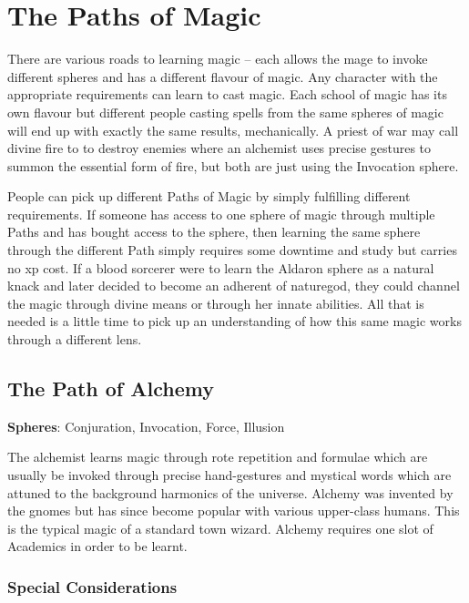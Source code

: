 \section{The Paths of Magic}

\begin{multicols}{2}

\noindent
There are various roads to learning magic -- each allows the mage to invoke different spheres and has a different flavour of magic.
Any character with the appropriate requirements can learn to cast magic.
Each school of magic has its own flavour but different people casting spells from the same spheres of magic will end up with exactly the same results, mechanically.
A priest of war may call divine fire to to destroy enemies where an alchemist uses precise gestures to summon the essential form of fire, but both are just using the Invocation sphere.

People can pick up different Paths of Magic by simply fulfilling different requirements.
If someone has access to one sphere of magic through multiple Paths and has bought access to the sphere, then learning the same sphere through the different Path simply requires some \gls{downtime} and study but carries no \gls{xp} cost.
If a blood sorcerer were to learn the Aldaron sphere as a natural knack and later decided to become an adherent of \gls{naturegod}, they could channel the magic through divine means or through her innate abilities.
All that is needed is a little time to pick up an understanding of how this same magic works through a different lens.

\subsection{The Path of Alchemy}

\noindent\textbf{Spheres}: Conjuration, Invocation, Force, Illusion

\noindent The alchemist learns magic through rote repetition and formulae which are usually be invoked through precise hand-gestures and mystical words which are attuned to the background harmonics of the universe.  Alchemy was invented by the gnomes but has since become popular with various upper-class humans. This is the typical magic of a standard town wizard. Alchemy requires one slot of Academics in order to be learnt.

\subsubsection{Special Considerations}


\end{multicols}

